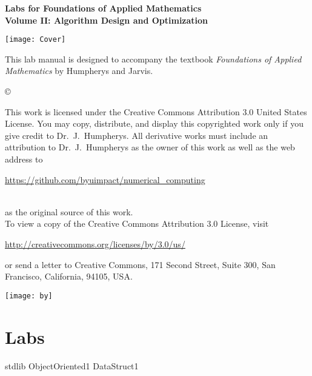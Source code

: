 \documentclass[nociteref]{SIAM-GH-book}
\begin{document}
\thispagestyle{empty}

\begin{center}
{\huge \bf Labs for Foundations of Applied Mathematics} \\
\vspace{5mm}
{\Large \bf Volume II: Algorithm
Design and Optimization}
\vspace{20mm}

\texttt{[image: Cover]}
\end{center}
\frontmatter




\begin{thepreface}
This lab manual is designed to accompany the textbook \emph{Foundations of Applied Mathematics} by Humpherys and Jarvis.

\vfill
\copyright{This work is licensed under the Creative Commons Attribution 3.0 United States
License.  You may copy, distribute, and display this copyrighted work only if you give
credit to Dr.~J.~Humpherys. All derivative works must include an attribution to Dr.~J.~Humpherys as the owner of this work as well as the web address to
\\\centerline{\url{https://github.com/byuimpact/numerical_computing}}\\ as the original source of
this
work.\\To view a copy of the Creative Commons Attribution 3.0 License,
visit\\\centerline{\url{http://creativecommons.org/licenses/by/3.0/us/}} or send a letter to
Creative Commons, 171 Second Street, Suite 300, San Francisco, California, 94105, USA.}

\vfill
\centering\texttt{[image: by]}
\vfill
\end{thepreface}

\setcounter{tocdepth}{1}
\tableofcontents

\mainmatter

\part{Labs}
{stdlib}
{ObjectOriented1}
{DataStruct1}
\end{document}
